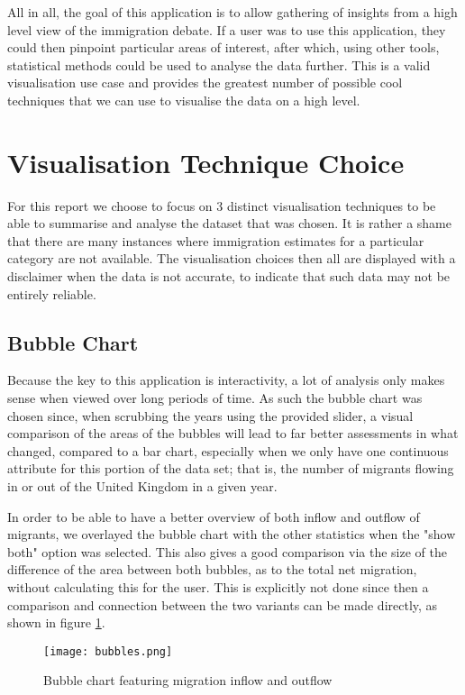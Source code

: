\documentclass[11pt,a4paper,titlepage]{article}
\begin{document}
All in all, the goal of this application is to allow gathering of insights from a high level view of the immigration debate. If a user was to use this application, they could then pinpoint particular areas of interest, after which, using other tools, statistical methods could be used to analyse the data further. This is a valid visualisation use case and provides the greatest number of possible cool techniques that we can use to visualise the data on a high level.

\section{Visualisation Technique Choice}
For this report we choose to focus on 3 distinct visualisation techniques to be able to summarise and analyse the dataset that was chosen. It is rather a shame that there are many instances where immigration estimates for a particular category are not available. The visualisation choices then all are displayed with a disclaimer when the data is not accurate, to indicate that such data may not be entirely reliable.

\subsection{Bubble Chart}
Because the key to this application is interactivity, a lot of analysis only makes sense when viewed over long periods of time. As such the bubble chart was chosen since, when scrubbing the years using the provided slider, a visual comparison of the areas of the bubbles will lead to far better assessments in what changed, compared to a bar chart, especially when we only have one continuous attribute for this portion of the data set; that is, the number of migrants flowing in or out of the United Kingdom in a given year.

In order to be able to have a better overview of both inflow and outflow of migrants, we overlayed the bubble chart with the other statistics when the "show both" option was selected. This also gives a good comparison via the size of the difference of the area between both bubbles, as to the total net migration, without calculating this for the user. This is explicitly not done since then a comparison and connection between the two variants can be made directly, as shown in figure \ref{fig_1}.

\begin{figure}[ht]
	\caption{Bubble chart featuring migration inflow and outflow}\label{fig_1}
	\centering
	\texttt{[image: bubbles.png]}
\end{figure}
\end{document}
